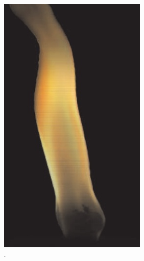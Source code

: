 \begin{figure}[htpb!]
\begin{subfigure}[t]{0.162\textwidth}
                \includegraphics[width=\textwidth]{img/hasinoff_2003}
                \caption{\cite{Hasinoff:2003}.}
        \end{subfigure}  
        ~ %
        \begin{subfigure}[t]{0.21\textwidth}

\end{subfigure}
\end{figure}
